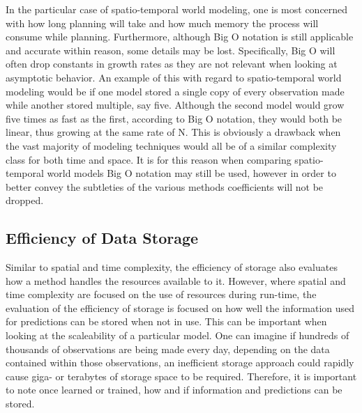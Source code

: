   In the particular case of spatio-temporal world modeling, one is most
  concerned with how long planning will take and how much memory the
  process will consume while planning. Furthermore, although Big O notation is
  still applicable and accurate within reason, some details may be lost.
  Specifically, Big O will often drop constants in growth rates as they are
  not relevant when looking at asymptotic behavior. An example of this with
  regard to spatio-temporal world modeling would be if one model stored a
  single copy of every observation made while another stored multiple, say
  five. Although the second model would grow five times as fast as the first,
  according to Big O notation, they would both be linear, thus growing at the
  same rate of N. This is obviously a drawback when the vast majority of
  modeling techniques would all be of a similar complexity class for both time
  and space. It is for this reason when comparing spatio-temporal world
  models Big O notation may still be used, however in order to better convey
  the subtleties of the various methods coefficients will not be dropped. \\


  \subsection{ Efficiency of Data Storage }
  Similar to spatial and time complexity, the efficiency of storage also
  evaluates how a method handles the resources available to it. However, where
  spatial and time complexity are focused on the use of resources during
  run-time, the evaluation of the efficiency of storage is focused on how well
  the information used for predictions can be stored when not in use. This
  can be important when looking at the scaleability of a particular model. One
  can imagine if hundreds of thousands of observations are being made every
  day, depending on the data contained within those observations, an
  inefficient storage approach could rapidly cause giga- or terabytes of storage
  space to be required. Therefore, it is important to note once learned or trained,
  how and if information and predictions can be stored. \\

